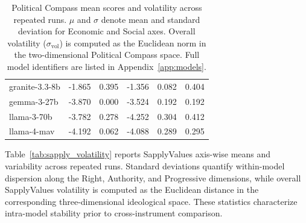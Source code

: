 \documentclass[11pt]{article}
\begin{document}
\begin{table}[t]
\begin{tabular}{l r r r r r}
granite-3.3-8b   & -1.865 & 0.395 & -1.356 & 0.082 & 0.404 \\
gemma-3-27b      & -3.870 & 0.000 & -3.524 & 0.192 & 0.192 \\
llama-3-70b      & -3.782 & 0.278 & -4.252 & 0.304 & 0.412 \\
llama-4-mav      & -4.192 & 0.062 & -4.088 & 0.289 & 0.295 \\
\bottomrule
\end{tabular}
\caption{Political Compass mean scores and volatility across repeated runs. $\mu$ and $\sigma$ denote mean and standard deviation for Economic and Social axes. Overall volatility ($\sigma_{\text{vol}}$) is computed as the Euclidean norm in the two-dimensional Political Compass space. Full model identifiers are listed in Appendix~\ref{app:models}.}
\label{tab:polcomp_volatility}
\end{table}



Table~\ref{tab:sapply_volatility} reports SapplyValues axis-wise means and variability across repeated runs. Standard deviations quantify within-model dispersion along the Right, Authority, and Progressive dimensions, while overall SapplyValues volatility is computed as the Euclidean distance in the corresponding three-dimensional ideological space. These statistics characterize intra-model stability prior to cross-instrument comparison.
\end{document}
